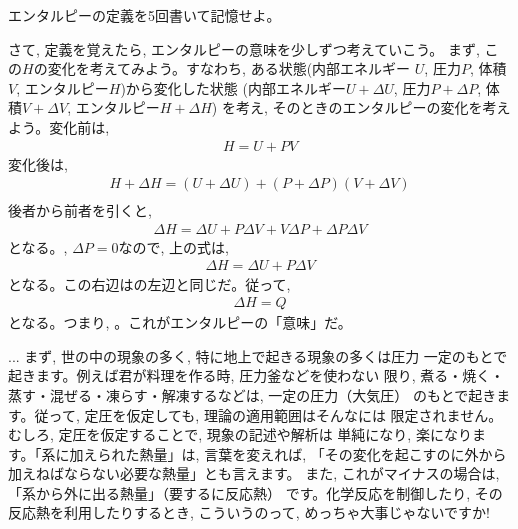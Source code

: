 \begin{q}\label{q:def_enthalpy} エンタルピーの定義を5回書いて記憶せよ。\end{q}\mv

さて, 定義を覚えたら, エンタルピーの意味を少しずつ考えていこう。
まず, この$H$の変化を考えてみよう。すなわち, ある状態(内部エネルギー
$U$, 圧力$P$, 体積$V$, エンタルピー$H$)から変化した状態
(内部エネルギー$U+\Delta U$, 圧力$P+\Delta P$, 体積$V+\Delta V$, エンタルピー$H+\Delta H$)
を考え, そのときのエンタルピーの変化を考えよう。変化前は, 
\begin{eqnarray}
H=U+PV
\end{eqnarray}
変化後は, 
\begin{eqnarray}
H+\Delta H=(U+\Delta U)+(P+\Delta P)(V+\Delta V)\nonumber\\
\end{eqnarray}
後者から前者を引くと, 
\begin{eqnarray}
\Delta H=\Delta U+P\Delta V+V\Delta P+\Delta P\Delta V\label{eq:enthalpy_change05}
\end{eqnarray}
となる。, $\Delta P=0$なので, 上の式は, 
\begin{eqnarray}
\Delta H=\Delta U+P\Delta V
\end{eqnarray}
となる。この右辺はの左辺と同じだ。従って, 
\begin{eqnarray}
\Delta H=Q
\end{eqnarray}
となる。つまり, 。これがエンタルピーの「意味」だ。

\begin{faq}{\small{}
 ... まず, 世の中の現象の多く, 特に地上で起きる現象の多くは圧力
一定のもとで起きます。例えば君が料理を作る時, 圧力釜などを使わない
限り, 煮る・焼く・蒸す・混ぜる・凍らす・解凍するなどは, 一定の圧力（大気圧）
のもとで起きます。従って, 定圧を仮定しても, 理論の適用範囲はそんなには
限定されません。むしろ, 定圧を仮定することで, 現象の記述や解析は
単純になり, 楽になります。「系に加えられた熱量」は, 言葉を変えれば, 
「その変化を起こすのに外から加えねばならない必要な熱量」とも言えます。
また, これがマイナスの場合は, 「系から外に出る熱量」（要するに反応熱）
です。化学反応を制御したり, その反応熱を利用したりするとき, こういうのって, 
めっちゃ大事じゃないですか!}\end{faq}\mv


